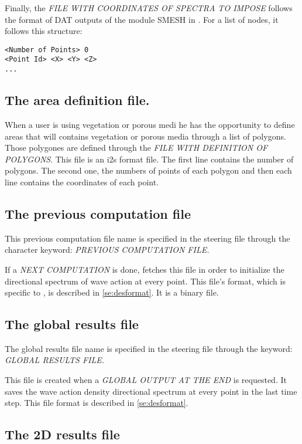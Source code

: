 Finally, the \textit{FILE WITH COORDINATES OF SPECTRA TO IMPOSE} follows the format of
DAT outputs of the module {\scshape SMESH} in \salome{}. For a list of nodes, it follows
this structure:

\lstset{language=TelemacCas,
        basicstyle=\scriptsize\ttfamily}
\begin{lstlisting}[frame=trBL]
<Number of Points> 0
<Point Id> <X> <Y> <Z>
...
\end{lstlisting}

\subsection{The area definition file.}
When a user is using vegetation or porous medi he has the opportunity to define areas
that will contains vegetation or porous media through a list of polygons. Those
polygones are defined through the {\it FILE WITH DEFINITION OF POLYGONS}. This file is
an i2s format file. The first line contains the number of polygons. The second one, the
numbers of points of each polygon and then each line contains the coordinates of each
point. 


\subsection{ The previous computation file}

This previous computation file name is specified in the steering file through the
character keyword: \textit{PREVIOUS COMPUTATION FILE.}

If a \textit{NEXT COMPUTATION} is done\textit{, }\tomawac fetches this file in order
to initialize the directional spectrum of wave action at every point. This file's
format, which is specific to \tomawac, is described in \ref{se:desformat}. It is a
 binary file.

\subsection{ The global results file}

The global results file name is specified in the steering file through the keyword:
\textit{GLOBAL RESULTS FILE.}

This file is created when a \textit{GLOBAL OUTPUT AT THE END} is requested. It saves
the wave action density directional spectrum at every point in the last time step. This
file format is described in \ref{se:desformat}.


\subsection{ The 2D results file }

